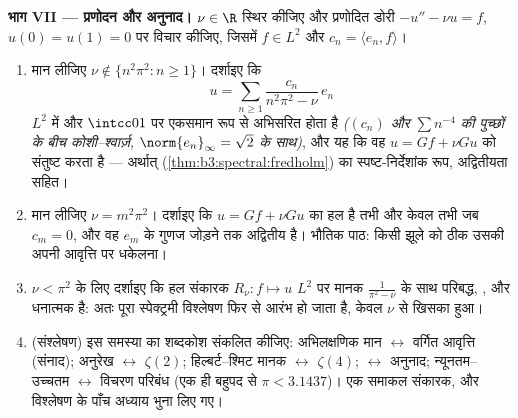 \begin{problem}[{सप्ताहांत समस्या --- ग्रीन संकारक, ज्या आधार,
और एक अनुरेख सूत्र}]
\medskip
\noindent\textbf{भाग VII --- प्रणोदन और अनुनाद।} $\nu \in \R$ स्थिर
कीजिए और प्रणोदित डोरी $-u'' - \nu u =
f$, $u(0) = u(1) = 0$ पर विचार कीजिए, जिसमें $f \in L^2$
और $c_n = \langle
e_n, f\rangle$।
\begin{enumerate}[resume]
  \item मान लीजिए $\nu \notin \{n^2\pi^2 : n \geq 1\}$। दर्शाइए कि
        \[
        u = \sum_{n\geq1}\frac{c_n}{n^2\pi^2 - \nu}\,e_n
        \]
        $L^2$ में और $\intcc01$ पर एकसमान रूप से अभिसरित होता है
        \emph{($(c_n)$ और $\sum n^{-4}$ की पुच्छों के बीच कोशी--श्वार्ज़,
        $\norm{e_n}_\infty =
        \sqrt2$ के साथ)}, और यह कि वह $u = Gf + \nu Gu$ को संतुष्ट करता है ---
        अर्थात्  (\cref{thm:b3:spectral:fredholm}) का स्पष्ट-निर्देशांक रूप,
        अद्वितीयता सहित।
  \item मान लीजिए $\nu = m^2\pi^2$। दर्शाइए कि $u = Gf + \nu
        Gu$ का हल है तभी और केवल
        तभी जब $c_m = 0$, और वह $e_m$ के गुणज जोड़ने तक अद्वितीय है।
        भौतिक पाठ: किसी झूले को ठीक उसकी अपनी आवृत्ति पर धकेलना।
  \item $\nu < \pi^2$ के लिए दर्शाइए कि हल संकारक $R_\nu\colon f \mapsto u$ $L^2$ पर मानक
        $\frac1{\pi^2 - \nu}$ के साथ परिबद्ध, ,  और धनात्मक है: अतः
        पूरा स्पेक्ट्रमी विश्लेषण फिर से आरंभ हो जाता है, केवल
        $\nu$ से खिसका हुआ।
  \item (संश्लेषण) इस समस्या का शब्दकोश संकलित कीजिए: अभिलक्षणिक
        मान $\leftrightarrow$ वर्गित आवृत्ति (संनाद); अनुरेख $\leftrightarrow$ $\zeta(2)$;
        हिल्बर्ट--श्मिट मानक $\leftrightarrow$ $\zeta(4)$;  $\leftrightarrow$
        अनुनाद; न्यूनतम--उच्चतम $\leftrightarrow$ विचरण परिबंध (एक ही बहुपद से
        $\pi <
        3.1437$)। एक समाकल संकारक, और विश्लेषण के पाँच अध्याय भुना
        लिए गए।
\end{enumerate}


\end{problem}
